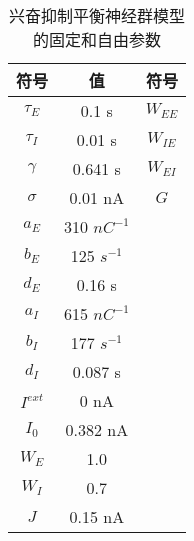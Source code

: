 \documentclass[lang=cn,a4paper,newtx,citestyle=gb7714-2015, bibstyle=gb7714-2015]{elegantpaper}
\begin{document}
\begin{table}[htbp]
	\centering
	\small
	\caption{兴奋抑制平衡神经群模型的固定和自由参数}
	\begin{tabular}{ccc}
		\toprule
		符号         &        值  & 符号     \\
		\midrule
		$\tau_E$      &   0.1 s      &      $ W_{EE} $  \\
		$\tau_I$      &   0.01 s      &      $ W_{IE} $  \\
		$\gamma$      &   0.641 s      &      $ W_{EI} $  \\
		$\sigma$      &   0.01 nA      &      $ G $  \\
		$a_E$      &   310 $ nC^{-1} $      &       \\
		$b_E$      &   125 $ s^{-1} $      &       \\
		$d_E$      &   0.16 s      &       \\
		$a_I$      &   615 $ nC^{-1} $      &       \\
		$b_I$      &   177 $ s^{-1} $      &       \\
		$d_I$      &   0.087 s      &       \\
		$I^{ext}$      &   0 nA       &       \\
		$I_0$      &   0.382 nA      &       \\
		$W_E$      &   1.0       &       \\
		$W_I$      &   0.7       &       \\
		$J$      &   0.15 nA      &       \\
		
		\bottomrule
	\end{tabular}%
	\label{tab:BEI_parameters}%
\end{table}%




\nocite{*}
\printbibliography[heading=bibintoc, title=\ebibname]

\appendix
\addappheadtotoc
\end{document}
